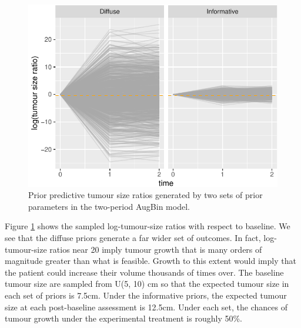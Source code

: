 \documentclass[article]{jss}
\begin{document}
\begin{CodeChunk}
\begin{figure}

{\centering \includegraphics{trialr_files/figure-latex/augbin_prior_pred_tumour-1} 

}

\caption[Prior predictive tumour size ratios generated by two sets of prior parameters in the two-period AugBin model]{Prior predictive tumour size ratios generated by two sets of prior parameters in the two-period AugBin model.}\label{fig:augbin_prior_pred_tumour}
\end{figure}
\end{CodeChunk}

Figure \ref{fig:augbin_prior_pred_tumour} shows the sampled
log-tumour-size ratios with respect to baseline. We see that the diffuse
priors generate a far wider set of outcomes. In fact, log-tumour-size
ratios near 20 imply tumour growth that is many orders of magnitude
greater than what is feasible. Growth to this extent would imply that
the patient could increase their volume thousands of times over. The
baseline tumour size are sampled from U(5, 10) cm so that the expected
tumour size in each set of priors is 7.5cm. Under the informative
priors, the expected tumour size at each post-baseline assessment is
12.5cm. Under each set, the chances of tumour growth under the
experimental treatment is roughly 50\%.
\end{document}
